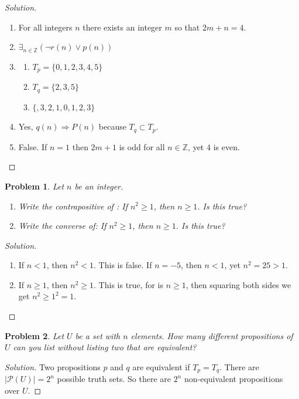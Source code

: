 \documentclass[oneside]{book}
\theoremstyle{mystyle}
\newtheorem{problem}{Problem}[section]
\begin{document}
\begin{proof}[Solution]
\
\begin{enumerate}
    \item For all integers $n$ there exists an integer $m$ so that $2m+n = 4$. 
    \item $\exists_{n\in \mathbb{Z}}(\neg r(n)\lor p(n))$
    \item   \begin{enumerate}
                \item $T_{p} = \{0,1,2,3,4,5\}$
                \item $T_{q} = \{2,3,5\}$
                \item $\{,3,2,1,0,1,2,3\}$
            \end{enumerate}
    \item Yes, $q(n)\Rightarrow P(n)$ because $T_{q}\subset T_{p}$.
    \item False. If $n = 1$ then $2m+1$ is odd for all $n\in \mathbb{Z}$, yet $4$ is even.
\end{enumerate}
\end{proof}
\begin{problem}
Let $n$ be an integer.
\begin{enumerate}
    \item Write the contrapositive of : If $n^2 \geq 1$, then $n\geq 1$. Is this true?
    \item Write the converse of: If $n^2 \geq 1$, then $n\geq 1$. Is this true?
\end{enumerate}
\end{problem}
\begin{proof}[Solution]
\
\begin{enumerate}
    \item If $n < 1$, then $n^2 <1$. This is false. If $n = -5$, then $n<1$, yet $n^2 = 25 >1$.
    \item If $n\geq 1$, then $n^2 \geq 1$. This is true, for is $n\geq 1$, then squaring both sides we get $n^2 \geq 1^2 = 1$.
\end{enumerate}
\end{proof}
\begin{problem}
Let $U$ be a set with $n$ elements. How many different propositions of $U$ can you list without listing two that are equivalent?
\end{problem}
\begin{proof}[Solution]
Two propositions $p$ and $q$ are equivalent if $T_p = T_q$. There are $|\mathcal{P}(U)| = 2^n$ possible truth sets. So there are $2^n$ non-equivalent propositions over $U$.
\end{proof}
\end{document}
